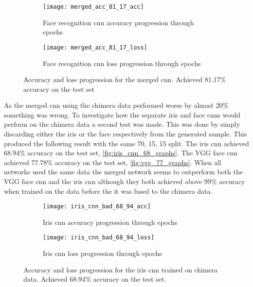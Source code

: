 \begin{figure}[H]
	\centering
	\begin{subfigure}{0.48\textwidth}
		\centering
		\texttt{[image: merged\_acc\_81\_17\_acc]}
		\caption{Face recognition \gls{cnn} accuracy progression through epochs}
		\label{fig:merged_acc}
	\end{subfigure}
	\begin{subfigure}{0.48\textwidth}
		\centering
		\texttt{[image: merged\_acc\_81\_17\_loss]}
		\caption{Face recognition \gls{cnn} loss progression through epochs}
		\label{fig:merged_loss}
	\end{subfigure}
	\caption{Accuracy and loss progression for the merged \gls{cnn}. Achieved 81.17\% accuracy on the test set}
	\label{fig:merged_graphs}
\end{figure}

\noindent As the merged \gls{cnn} using the chimera data performed worse by almost 20\% something was wrong. To investigate how the separate iris and face \gls{cnn}s would perform on the chimera data a second test was made. This was done by simply discarding either the iris or the face respectively from the generated sample. This produced the following result with the same 70, 15, 15 split.  The iris \gls{cnn} achieved 68.94\% accuracy on the test set, \autoref{fig:iris_cnn_68_graphs}. The VGG face \gls{cnn} achieved 77.78\% accuracy on the test set, \autoref{fig:vgg_77_graphs}. When all networks used the same data the merged network seems to outperform both the VGG face \gls{cnn} and the iris \gls{cnn} although they both achieved above 99\% accuracy when trained on the data before the it was fused to the chimera data.

\begin{figure}[H]
	\centering
	\begin{subfigure}{0.48\textwidth}
		\centering
		\texttt{[image: iris\_cnn\_bad\_68\_94\_acc]}
		\caption{Iris \gls{cnn} accuracy progression through epochs}
		\label{fig:iris_cnn_68_acc}
	\end{subfigure}
	\begin{subfigure}{0.48\textwidth}
		\centering
		\texttt{[image: iris\_cnn\_bad\_68\_94\_loss]}
		\caption{Iris \gls{cnn} loss progression through epochs}
		\label{fig:iris_cnn_68_loss}
	\end{subfigure}
	\caption{Accuracy and loss progression for the iris \gls{cnn} trained on chimera data. Achieved 68.94\% accuracy on the test set.}
	\label{fig:iris_cnn_68_graphs}
\end{figure}


